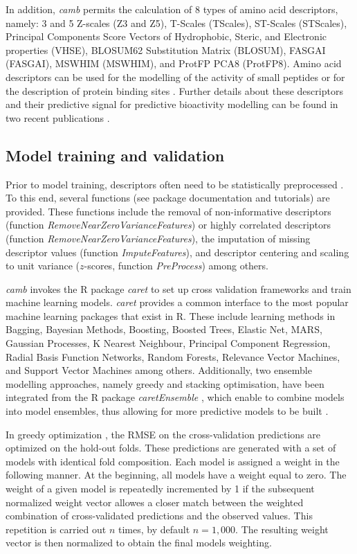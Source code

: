 \documentclass[twoside,a4wide,10pt]{article}
\begin{document}
In addition, {\it camb} permits the calculation of 8 types of amino acid descriptors, namely:
3 and 5 Z-scales (Z3 and Z5), T-Scales (TScales), ST-Scales (STScales), 
Principal Components Score Vectors of Hydrophobic, Steric, and Electronic properties (VHSE), 
BLOSUM62 Substitution Matrix (BLOSUM), FASGAI (FASGAI), MSWHIM (MSWHIM), and ProtFP PCA8 (ProtFP8).
Amino acid descriptors can be used for the modelling of the activity of small peptides
or for the description of protein binding sites \citep{AA_benchmark,adenosine,cortesCOX,cortesReview}.
Further details about these descriptors and their predictive signal
for predictive bioactivity modelling can be found in two recent publications \citep{AA_benchmark1,AA_benchmark}.

\subsection{Model training and validation}

Prior to model training, descriptors often need to be statistically preprocessed \citep{andersson}.
To this end, several functions (see package documentation and tutorials)
are provided.
These functions include the removal of non-informative descriptors (function {\it RemoveNearZeroVarianceFeatures})
or highly correlated descriptors (function {\it RemoveNearZeroVarianceFeatures}),
the imputation of missing descriptor values (function {\it ImputeFeatures}),
and descriptor centering and scaling to unit variance ($z$-scores, function {\it PreProcess}) among others.

{\it camb} invokes the R package {\it caret} to set up cross validation frameworks and
train machine learning models. {\it caret} provides a common interface to the most popular machine learning packages that exist in R.
These include learning methods in Bagging, Bayesian Methods, Boosting, Boosted Trees, Elastic Net, MARS, Gaussian Processes, K Nearest Neighbour, Principal Component Regression, Radial Basis Function Networks, Random Forests, Relevance Vector Machines, and Support Vector Machines among others.
Additionally, two ensemble modelling approaches, namely greedy and stacking optimisation,
have been integrated from the R package {\it caretEnsemble} \citep{caretEnsemble},
which enable to combine models into model ensembles, thus allowing for more predictive models to be built \citep{cortesCOX}.

In greedy optimization \citep{caruana}, the RMSE on the cross-validation predictions are optimized on the hold-out folds. 
These predictions are generated with a set of models with identical fold composition. 
Each model is assigned a weight in the following manner. 
At the beginning, all models have a weight equal to zero. 
The weight of a given model is repeatedly incremented by 1 if the subsequent normalized weight vector allowes a
closer match between the weighted combination of cross-validated predictions and the observed values. 
This repetition is carried out $n$ times, by default $n = 1,000$.
The resulting weight vector is then normalized to obtain the final models weighting.\\
\end{document}
